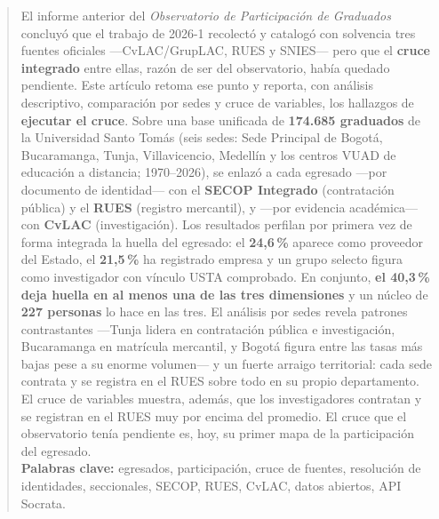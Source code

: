 \documentclass[11pt,letterpaper]{article}
\begin{document}
\begin{abstract}
\noindent El informe anterior del \emph{Observatorio de Participación de Graduados} concluyó que el trabajo de 2026-1 recolectó y catalogó con solvencia tres fuentes oficiales ---CvLAC/GrupLAC, RUES y SNIES--- pero que el \textbf{cruce integrado} entre ellas, razón de ser del observatorio, había quedado pendiente. Este artículo retoma ese punto y reporta, con análisis descriptivo, comparación por sedes y cruce de variables, los hallazgos de \textbf{ejecutar el cruce}. Sobre una base unificada de \textbf{174.685 graduados} de la Universidad Santo Tomás (seis sedes: Sede Principal de Bogotá, Bucaramanga, Tunja, Villavicencio, Medellín y los centros VUAD de educación a distancia; 1970--2026), se enlazó a cada egresado ---por documento de identidad--- con el \textbf{SECOP Integrado} (contratación pública) y el \textbf{RUES} (registro mercantil), y ---por evidencia académica--- con \textbf{CvLAC} (investigación). Los resultados perfilan por primera vez de forma integrada la huella del egresado: el \textbf{24,6\,\%} aparece como proveedor del Estado, el \textbf{21,5\,\%} ha registrado empresa y un grupo selecto figura como investigador con vínculo USTA comprobado. En conjunto, \textbf{el 40,3\,\% deja huella en al menos una de las tres dimensiones} y un núcleo de \textbf{227 personas} lo hace en las tres. El análisis por sedes revela patrones contrastantes ---Tunja lidera en contratación pública e investigación, Bucaramanga en matrícula mercantil, y Bogotá figura entre las tasas más bajas pese a su enorme volumen--- y un fuerte arraigo territorial: cada sede contrata y se registra en el RUES sobre todo en su propio departamento. El cruce de variables muestra, además, que los investigadores contratan y se registran en el RUES muy por encima del promedio. El cruce que el observatorio tenía pendiente es, hoy, su primer mapa de la participación del egresado. \\[4pt]
\noindent\textbf{Palabras clave:} egresados, participación, cruce de fuentes, resolución de identidades, seccionales, SECOP, RUES, CvLAC, datos abiertos, API Socrata.
\end{abstract}
\vspace{2pt}










\end{document}
